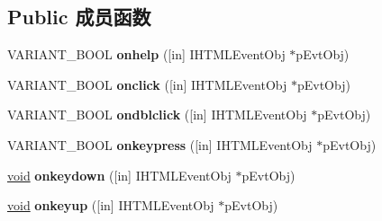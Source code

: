 \subsection*{Public 成员函数}
\begin{DoxyCompactItemize}
\item 
\mbox{\label{interface_m_s_h_t_m_l_1_1_h_t_m_l_form_element_events2_a6a9187a6bad0dd220b29a93f68fec4d9}} 
V\+A\+R\+I\+A\+N\+T\+\_\+\+B\+O\+OL {\bfseries onhelp} (\mbox{[}in\mbox{]} I\+H\+T\+M\+L\+Event\+Obj $\ast$p\+Evt\+Obj)
\item 
\mbox{\label{interface_m_s_h_t_m_l_1_1_h_t_m_l_form_element_events2_af00d8e57fea44cf983633fa88af42e76}} 
V\+A\+R\+I\+A\+N\+T\+\_\+\+B\+O\+OL {\bfseries onclick} (\mbox{[}in\mbox{]} I\+H\+T\+M\+L\+Event\+Obj $\ast$p\+Evt\+Obj)
\item 
\mbox{\label{interface_m_s_h_t_m_l_1_1_h_t_m_l_form_element_events2_a12a3573c95a84943daf9c0a12de1d226}} 
V\+A\+R\+I\+A\+N\+T\+\_\+\+B\+O\+OL {\bfseries ondblclick} (\mbox{[}in\mbox{]} I\+H\+T\+M\+L\+Event\+Obj $\ast$p\+Evt\+Obj)
\item 
\mbox{\label{interface_m_s_h_t_m_l_1_1_h_t_m_l_form_element_events2_a095c033fd5d2ee58e39350735a3fe947}} 
V\+A\+R\+I\+A\+N\+T\+\_\+\+B\+O\+OL {\bfseries onkeypress} (\mbox{[}in\mbox{]} I\+H\+T\+M\+L\+Event\+Obj $\ast$p\+Evt\+Obj)
\item 
\mbox{\label{interface_m_s_h_t_m_l_1_1_h_t_m_l_form_element_events2_ad0e8b4eef58489c4483fa2d0697835bc}} 
\hyperlink{interfacevoid}{void} {\bfseries onkeydown} (\mbox{[}in\mbox{]} I\+H\+T\+M\+L\+Event\+Obj $\ast$p\+Evt\+Obj)
\item 
\mbox{\label{interface_m_s_h_t_m_l_1_1_h_t_m_l_form_element_events2_a82ca04797707fff2aa4fcc78c4805400}} 
\hyperlink{interfacevoid}{void} {\bfseries onkeyup} (\mbox{[}in\mbox{]} I\+H\+T\+M\+L\+Event\+Obj $\ast$p\+Evt\+Obj)
\item 
\mbox{\label{interface_m_s_h_t_m_l_1_1_h_t_m_l_form_element_events2_afc80871b4b0fa9b209544554f817a873}} 

\end{DoxyCompactItemize}
